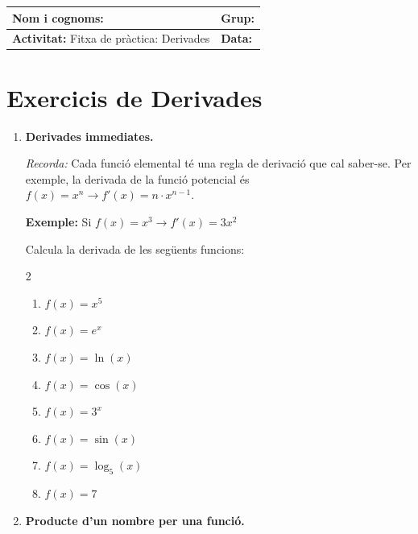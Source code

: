 \documentclass[12pt,a4paper]{article}
\begin{document}
\begingroup
\renewcommand{\arraystretch}{2.2}
\begin{tabularx}{\textwidth}{|X|p{4cm}|}
\hline
\textbf{Nom i cognoms:} & \textbf{Grup:} \\ \hline
\textbf{Activitat:} Fitxa de pràctica: Derivades & \textbf{Data:} \\ \hline
\end{tabularx}
\endgroup

\vspace{0.5cm}

\section*{Exercicis de Derivades}

\begin{enumerate}[leftmargin=*, label=\textbf{\arabic*.}]

    \item \textbf{Derivades immediates.}
    
    \textit{Recorda:} Cada funció elemental té una regla de derivació que cal saber-se. Per exemple, la derivada de la funció potencial és $f(x) = x^n \rightarrow f'(x) = n \cdot x^{n-1}$.
    
    \textbf{Exemple:} Si $f(x) = x^3 \rightarrow f'(x) = 3x^2$
    \vspace{0.2cm}
    
    Calcula la derivada de les següents funcions:
    \begin{multicols}{2}
    \begin{enumerate}[label=\alph*)]
        \item $f(x) = x^5$
        \item $f(x) = e^x$
        \item $f(x) = \ln(x)$
        \item $f(x) = \cos(x)$
        \item $f(x) = 3^x$
        \item $f(x) = \sin(x)$
        \item $f(x) = \log_5(x)$
        \item $f(x) = 7$
    \end{enumerate}
    \end{multicols}
    \vspace{0.4cm}

    \item \textbf{Producte d'un nombre per una funció.}
    

\end{enumerate}
\end{document}
